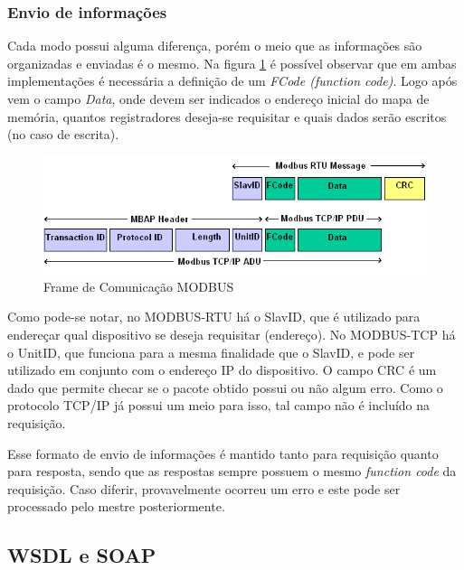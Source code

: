       \subsubsection{Envio de informações}
      \label{methodology:tools:modbus:frame}

        Cada modo possui alguma diferença, porém o meio que as informações são organizadas e enviadas é o mesmo. Na figura \ref{fig:modbus-frame} é possível observar que em ambas implementações é necessária a definição de um \textit{FCode (function code)}. Logo após vem o campo \textit{Data}, onde devem ser indicados o endereço inicial do mapa de memória, quantos registradores deseja-se requisitar e quais dados serão escritos (no caso de escrita).

        \begin{figure}[H]
          \begin{center}
            \includegraphics[width=\textwidth,natwidth=585,natheight=180]{assets/images/modbus-frame.png}
            \caption{Frame de Comunicação MODBUS}
            \label{fig:modbus-frame}
          \end{center}
        \end{figure}

        Como pode-se notar, no MODBUS-RTU há o SlavID, que é utilizado para endereçar qual dispositivo se deseja requisitar (endereço). No MODBUS-TCP há o UnitID, que funciona para a mesma finalidade que o SlavID, e pode ser utilizado em conjunto com o endereço IP do dispositivo. O campo CRC é um dado que permite checar se o pacote obtido possui ou não algum erro. Como o protocolo TCP/IP já possui um meio para isso, tal campo não é incluído na requisição.

        Esse formato de envio de informações é mantido tanto para requisição quanto para resposta, sendo que as respostas sempre possuem o mesmo \textit{function code} da requisição. Caso diferir, provavelmente ocorreu um erro e este pode ser processado pelo mestre posteriormente.

    \subsection{WSDL e SOAP}
    \label{methodology:tools:wsdlsoap}

